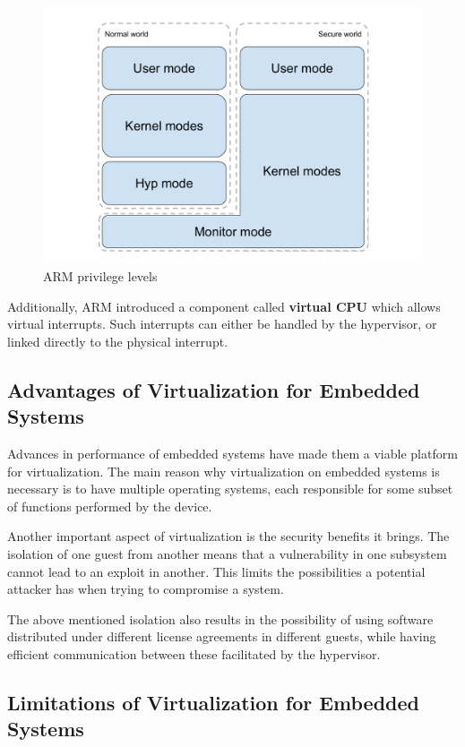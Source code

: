 \begin{figure}[h]
\centering
  \includegraphics[width=.75\linewidth]{img/arm.pdf}
  \caption{ARM privilege levels}
\end{figure}

Additionally, ARM introduced a component called \textbf{virtual CPU} which allows virtual interrupts. Such interrupts can either be handled by the hypervisor, or linked directly to the physical interrupt\cite{hw-support-arm}.

\subsection{Advantages of Virtualization for Embedded Systems}
\label{subsec:advvirt}

Advances in performance of embedded systems have made them a viable platform for virtualization. The main reason why virtualization on embedded systems is necessary is to have multiple operating systems, each responsible for some subset of functions performed by the device.

Another important aspect of virtualization is the security benefits it brings. The isolation of one guest from another means that a vulnerability in one subsystem cannot lead to an exploit in another. This limits the possibilities a potential attacker has when trying to compromise a system\cite{virt-embedded}.

The above mentioned isolation also results in the possibility of using software distributed under different license agreements in different guests, while having efficient communication between these facilitated by the hypervisor.

\subsection{Limitations of Virtualization for Embedded Systems}
\label{subsec:limitvirt}

